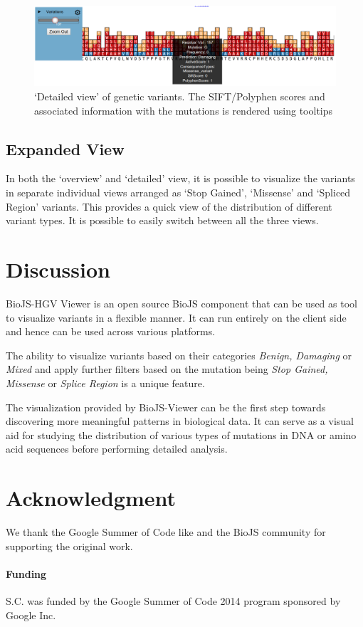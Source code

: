 \documentclass{bioinfo}
\begin{document}
\begin{figure}
\includegraphics[width=\linewidth]{images/zoomed_withtooltip}
\caption{`Detailed view' of genetic variants. The SIFT/Polyphen scores and associated information with the mutations is rendered using tooltips}
\label{zoomedtooltip}
\end{figure}

\subsection{Expanded View}

In both the `overview' and `detailed' view, it is possible
to visualize the variants in separate individual views arranged as `Stop Gained', `Missense' and `Spliced Region' variants. This provides a quick view of the distribution of different variant types. It is possible to easily switch between all the three views.\\


\section{Discussion}

BioJS-HGV Viewer is an open source BioJS component that can be used as tool to visualize variants in a flexible manner. It can run entirely on the client side and hence can be used across various platforms. 

The ability to visualize variants  based on their categories \textit{Benign, Damaging} or \textit{Mixed} and apply further filters based on the mutation being \textit{Stop Gained, Missense} or \textit{Splice Region} is a unique feature.

The visualization provided by BioJS-Viewer can be the first step towards discovering more meaningful patterns in biological data. It can serve as a visual aid for studying the distribution of various types of mutations in DNA  or amino acid sequences before performing detailed analysis.

\section*{Acknowledgment}

We thank the Google Summer of Code like and the BioJS community for supporting the original work.


\paragraph{Funding\textcolon} S.C. was funded by the Google Summer of Code 2014 program sponsored by Google Inc.


%
%
%
%
%
%
%

\end{document}
